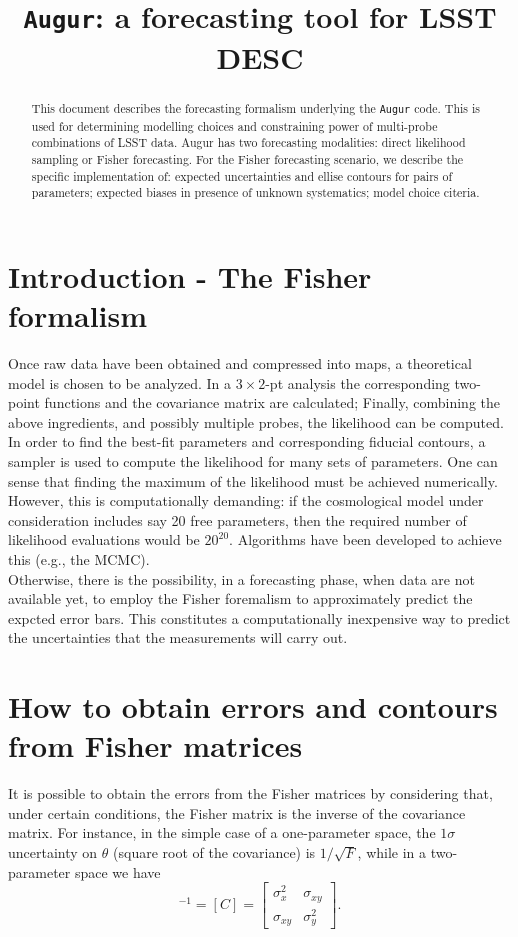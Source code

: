 \documentclass[modern]{lsstdescnote}
\begin{document}
\title{{\tt Augur}: a forecasting tool for LSST DESC}

\maketitlepre

\begin{abstract}
  This document describes the forecasting formalism underlying the {\tt Augur} code. This is used for determining modelling choices and constraining power of multi-probe combinations of LSST data.
  Augur has two forecasting modalities: direct likelihood sampling or Fisher forecasting.
  For the Fisher forecasting scenario, we describe the specific implementation of: expected uncertainties and ellise contours for pairs of parameters; expected biases in presence of unknown systematics; model choice citeria.
\end{abstract}

\maketitlepost

\newpage
\tableofcontents{}
\newpage


\section{Introduction - The Fisher formalism}
Once raw data have been obtained and compressed into maps, a theoretical model is chosen 
to be analyzed. In a $3\times 2$-pt analysis the corresponding two-point functions and the covariance matrix are calculated;
Finally, combining the above ingredients, and possibly multiple probes, the likelihood can be computed.
In order to find the best-fit parameters and corresponding fiducial contours, a sampler is used to compute the likelihood 
for many sets of parameters. One can sense that finding the maximum of the likelihood must be achieved numerically.
However, this is computationally demanding: if the cosmological model under consideration includes say 20 free parameters,
then the required number of likelihood evaluations would be $20^{20}$. Algorithms have been developed to achieve this (e.g., the MCMC).\\
Otherwise, there is the possibility, in a forecasting phase, when data are not available yet, to employ the Fisher 
foremalism to approximately predict the expcted error bars. This constitutes a computationally inexpensive way
to predict the uncertainties that the measurements will carry out.

\section{How to obtain errors and contours from Fisher matrices}
It is possible to obtain the errors from the Fisher matrices by considering that, under certain conditions,
the Fisher matrix is the inverse of the covariance matrix.
For instance, in the simple case of a one-parameter space, the $1\sigma$ uncertainty on $\theta$ (square root of the covariance) is $1/\sqrt{F}$, while in a two-parameter space we have 
\begin{equation}
[F]^{-1}=[C]=\left[\begin{array}{cc}
\sigma_{x}^{2} & \sigma_{x y} \\
\sigma_{x y} & \sigma_{y}^{2}
\end{array}\right].
\end{equation}
\end{document}

